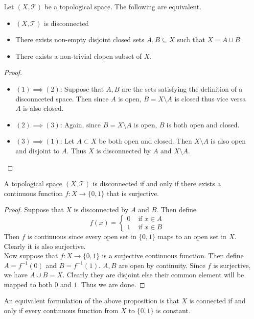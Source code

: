 \documentclass[a4paper]{article}
\begin{document}
\begin{prp}{}{} Let $(X,\mathcal{T})$ be a topological space. The following are equivalent. 
\begin{itemize}
\item $(X,\mathcal{T})$ is disconnected
\item There exists non-empty disjoint closed sets $A,B\subseteq X$ such that $X=A\cup B$
\item There exists a non-trivial clopen subset of $X$. 
\end{itemize} 
\begin{proof}~\\
\begin{itemize}
\item $(1)\implies(2)$: Suppose that $A,B$ are the sets satisfying the definition of a disconnceted space. Then since $A$ is open, $B=X\setminus A$ is closed thus vice versa $A$ is also closed. 
\item $(2)\implies(3)$: Again, since $B=X\setminus A$ is open, $B$ is both open and closed. 
\item $(3)\implies(1)$: Let $A\subset X$ be both open and closed. Then $X\setminus A$ is also open and disjoint to $A$. Thus $X$ is disconnected by $A$ and $X\setminus A$. 
\end{itemize}
\end{proof}
\end{prp}

\begin{prp}{}{} A topological space $(X,\mathcal{T})$ is disconnected if and only if there exists a continuous function $f:X\to\{0,1\}$ that is surjective. 
\begin{proof}
Suppose that $X$ is disconnected by $A$ and $B$. Then define $$f(x)=\begin{cases}
0 &\text{ if }x\in A\\
1 & \text{ if }x\in B
\end{cases}$$
Then $f$ is continuous since every open set in $\{0,1\}$ maps to an open set in $X$. Clearly it is also surjective. \\
Now suppose that $f:X\to\{0,1\}$ is a surjective continuous function. Then define $A=f^{-1}(0)$ and $B=f^{-1}(1)$. $A,B$ are open by continuity. Since $f$ is surjective, we have $A\cup B=X$. Clearly they are disjoint else their common element will be mapped to both $0$ and $1$. Thus we are done. 
\end{proof}
\end{prp}

An equivalent formulation of the above proposition is that $X$ is connected if and only if every continuous function from $X$ to $\{0,1\}$ is constant. 
\end{document}
